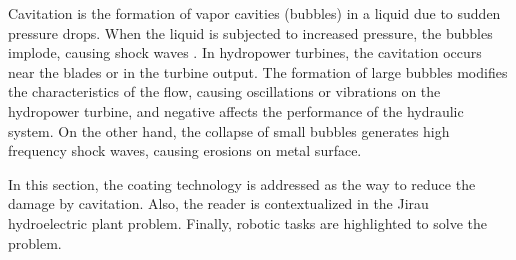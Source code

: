 Cavitation is the formation of vapor cavities (bubbles) in a liquid due to
sudden pressure drops. When the liquid is subjected to increased pressure,
the bubbles implode, causing shock waves \citep{brennen2013cavitation}. 
In hydropower turbines, the cavitation occurs near the blades or
in the turbine output.%
The formation of large bubbles modifies the
characteristics of the flow, causing oscillations or vibrations on the
hydropower turbine, and negative affects the performance of the hydraulic
system. On the other hand, the collapse of small bubbles generates high
frequency shock waves, causing erosions on metal surface.


In this section, the coating technology is addressed as the way to
reduce the damage by cavitation. Also, the reader is contextualized in
the Jirau hydroelectric plant problem. Finally,  robotic tasks are highlighted to
solve the problem.

